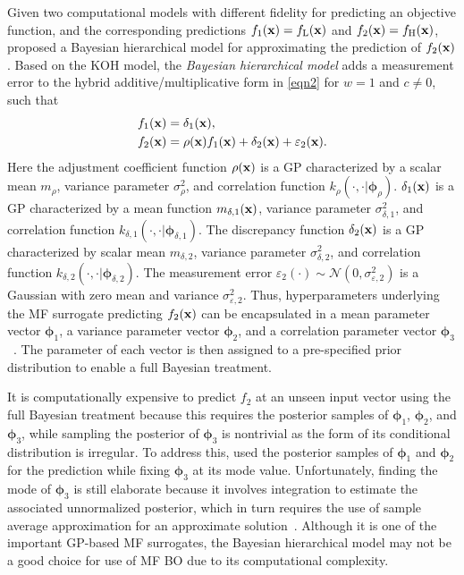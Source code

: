 \documentclass[journal ]{new-aiaa}
\begin{document}
	Given two computational models with different fidelity for predicting an objective function, and the corresponding predictions $f_1({\bf x})= f_\text{L}({\bf x})$ and $f_2({\bf x})= f_\text{H}({\bf x})$,
	\citet{Qian2008} proposed a Bayesian hierarchical model for approximating the prediction of $f_\text{2}({\bf x})$.
	Based on the KOH model, the \textit{Bayesian hierarchical model} adds a measurement error to the hybrid additive/multiplicative form in \cref{eqn2} for $w=1$ and $c \neq 0$, such that
	\begin{subequations}\label{eqn19}
		\begin{align}
			f_1({\bf x}) & = \delta_1({\bf x}) \label{eqn19-1},\\
			f_\text{2}({\bf x}) & = \rho({\bf x})f_\text{1}({\bf x}) + \delta_2({\bf x})+\varepsilon_2({\bf x}) \label{eqn19-2}.
		\end{align}
	\end{subequations}
	Here the adjustment coefficient function $\rho({\bf x})$ is a GP characterized by a scalar mean $m_\rho$, variance parameter $\sigma^2_\rho$, and correlation function $k_\rho(\cdot,\cdot|{\boldsymbol \phi}_\rho)$.
	$\delta_\text{1}({\bf x})$ is a GP characterized by a mean function $m_{\delta,1}({\bf x})$, variance parameter $\sigma^2_{\delta,1}$, and correlation function $k_{\delta,1}(\cdot,\cdot|{\boldsymbol \phi}_{\delta,1})$.
	The discrepancy function $\delta_2({\bf x})$ is a GP characterized by scalar mean $m_{\delta,2}$, variance parameter $\sigma^2_{\delta,2}$, and correlation function $k_{\delta,2}(\cdot,\cdot|{\boldsymbol \phi}_{\delta,2})$.
	The measurement error $\varepsilon_\text{2}(\cdot) \sim \mathcal{N}(0,\sigma^2_{\varepsilon,2})$ is a Gaussian with zero mean and variance $\sigma^2_{\varepsilon,2}$.
	Thus, hyperparameters underlying the MF surrogate predicting $f_\text{2}({\bf x})$ can be encapsulated in a mean parameter vector ${\boldsymbol \phi}_1$, a variance parameter vector ${\boldsymbol \phi}_2$, and
	a correlation parameter vector ${\boldsymbol \phi}_3$~\citep{Qian2008}. 
	The parameter of each vector is then assigned to a pre-specified prior distribution to enable a full Bayesian treatment.
	
	It is computationally expensive to predict $f_2$ at an unseen input vector using the full Bayesian treatment because this requires the posterior samples of ${\boldsymbol \phi}_1$, ${\boldsymbol \phi}_2$, and ${\boldsymbol \phi}_3$, while sampling the posterior of ${\boldsymbol \phi}_3$ is nontrivial as the form of its conditional distribution is irregular.
	To address this, \citet{Qian2008} used the posterior samples of ${\boldsymbol \phi}_1$ and ${\boldsymbol \phi}_2$ for the prediction while fixing ${\boldsymbol \phi}_3$ at its mode value.
	Unfortunately, finding the mode of ${\boldsymbol \phi}_3$ is still elaborate because it involves integration to estimate the associated unnormalized posterior, which in turn requires the use of sample average approximation for an approximate solution~\citep{Verweij2003}.
	Although it is one of the important GP-based MF surrogates, the Bayesian hierarchical model may not be a good choice for use of MF BO due to its computational complexity.
	
\end{document}
